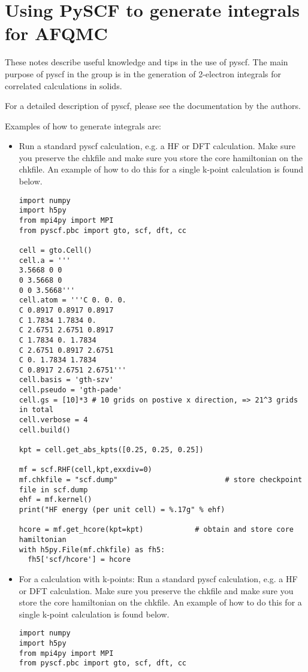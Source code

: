 \section{Using PySCF to generate integrals for AFQMC}
\label{sec:pyscf}
These notes describe useful knowledge and tips in the use of pyscf. 
The main purpose of pyscf in the group is in the generation of 2-electron integrals for correlated calculations in solids.

For a detailed description of pyscf, please see the documentation by the authors.

Examples of how to generate integrals are:
\begin{itemize}
\item Run a standard pyscf calculation, e.g. a HF or DFT calculation. Make sure you preserve the chkfile and make sure you store the core hamiltonian on the chkfile. An example of how to do this for a single k-point calculation is found below.
\begin{lstlisting}[caption=The following is an example PySCF input file for single k-point calculations.]
import numpy
import h5py
from mpi4py import MPI
from pyscf.pbc import gto, scf, dft, cc

cell = gto.Cell()
cell.a = '''
3.5668 0 0
0 3.5668 0
0 0 3.5668'''
cell.atom = '''C 0. 0. 0. 
C 0.8917 0.8917 0.8917
C 1.7834 1.7834 0. 
C 2.6751 2.6751 0.8917
C 1.7834 0. 1.7834
C 2.6751 0.8917 2.6751
C 0. 1.7834 1.7834
C 0.8917 2.6751 2.6751'''
cell.basis = 'gth-szv'
cell.pseudo = 'gth-pade'
cell.gs = [10]*3 # 10 grids on postive x direction, => 21^3 grids in total
cell.verbose = 4
cell.build()

kpt = cell.get_abs_kpts([0.25, 0.25, 0.25])  

mf = scf.RHF(cell,kpt,exxdiv=0)
mf.chkfile = "scf.dump"                         # store checkpoint file in scf.dump
ehf = mf.kernel()
print("HF energy (per unit cell) = %.17g" % ehf)

hcore = mf.get_hcore(kpt=kpt)            # obtain and store core hamiltonian
with h5py.File(mf.chkfile) as fh5:
  fh5['scf/hcore'] = hcore
\end{lstlisting}

\item {For a calculation with k-points:
Run a standard pyscf calculation, e.g. a HF or DFT calculation. Make sure you preserve the chkfile and make sure you store the core hamiltonian on the chkfile. An example of how to do this for a single k-point calculation is found below.}

\begin{lstlisting}[caption=The following is an example PySCF input file for calculations with k-points.]
import numpy
import h5py
from mpi4py import MPI
from pyscf.pbc import gto, scf, dft, cc


\end{lstlisting}
\end{itemize}
